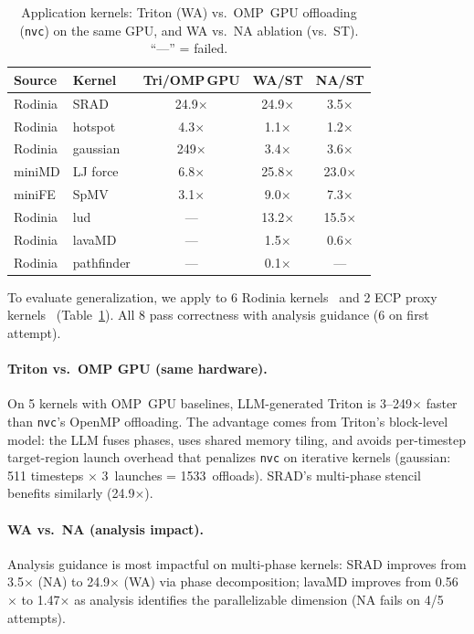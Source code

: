 \begin{table}[t]
  \caption{Application kernels: Triton (WA) vs.\ OMP~GPU offloading
    (\texttt{nvc}) on the same GPU, and WA vs.\ NA ablation (vs.\ ST).
    ``---'' = failed.}
  \label{tab:realworld}
  \centering\small
  \begin{tabular}{llccc}
    \toprule
    \textbf{Source} & \textbf{Kernel} & \textbf{Tri/OMP\,GPU} & \textbf{WA/ST} & \textbf{NA/ST} \\
    \midrule
    Rodinia & SRAD       & 24.9$\times$  & 24.9$\times$ & 3.5$\times$ \\
    Rodinia & hotspot    & 4.3$\times$   & 1.1$\times$  & 1.2$\times$ \\
    Rodinia & gaussian   & 249$\times$   & 3.4$\times$  & 3.6$\times$ \\
    miniMD  & LJ force   & 6.8$\times$   & 25.8$\times$ & 23.0$\times$ \\
    miniFE  & SpMV       & 3.1$\times$   & 9.0$\times$  & 7.3$\times$ \\
    \midrule
    Rodinia & lud        & ---           & 13.2$\times$ & 15.5$\times$ \\
    Rodinia & lavaMD     & ---           & 1.5$\times$  & 0.6$\times$ \\
    Rodinia & pathfinder & ---           & 0.1$\times$  & --- \\
    \bottomrule
  \end{tabular}
\end{table}

To evaluate generalization, we apply \sysname to 6 Rodinia
kernels~\cite{che2009rodinia} and 2 ECP proxy
kernels~\cite{heroux2009mantevo} (Table~\ref{tab:realworld}).
All 8 pass correctness with analysis guidance (6 on first attempt).

\paragraph{Triton vs.\ OMP GPU (same hardware).}
On 5 kernels with OMP~GPU baselines, LLM-generated Triton
is 3--249$\times$ faster than \texttt{nvc}'s OpenMP offloading.
The advantage comes from Triton's block-level model: the LLM
fuses phases, uses shared memory tiling, and avoids
per-timestep target-region launch overhead that penalizes
\texttt{nvc} on iterative kernels (gaussian: 511 timesteps
$\times$ 3~launches = 1533~offloads).  SRAD's multi-phase
stencil benefits similarly (24.9$\times$).

\paragraph{WA vs.\ NA (analysis impact).}
Analysis guidance is most impactful on multi-phase kernels:
SRAD improves from 3.5$\times$ (NA) to 24.9$\times$ (WA)
via phase decomposition; lavaMD improves from 0.56$\times$ to
1.47$\times$ as analysis identifies the parallelizable dimension
(NA fails on 4/5 attempts).
